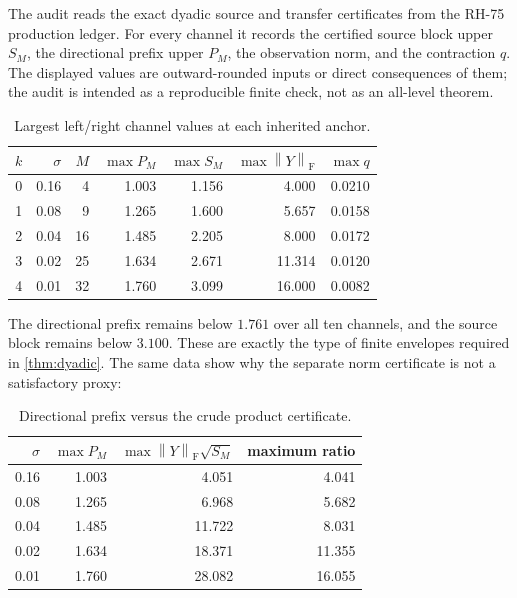 \documentclass[11pt]{article}
\theoremstyle{definition}
\theoremstyle{remark}
\newcommand{\norm}[1]{\left\lVert#1\right\rVert}
\newcommand{\F}{\mathrm F}
\begin{document}
The audit reads the exact dyadic source and transfer certificates from the
RH-75 production ledger.  For every channel it records the certified source
block upper $S_M$, the directional prefix upper $P_M$, the observation norm,
and the contraction $q$.  The displayed values are outward-rounded inputs or
direct consequences of them; the audit is intended as a reproducible finite
check, not as an all-level theorem.

\begin{table}[H]
\centering
\small
\caption{Largest left/right channel values at each inherited anchor.}
\label{tab:anchors}
\begin{tabular}{@{}rrrrrrr@{}}
\toprule
$k$ & $\sigma$ & $M$ & $\max P_M$ & $\max S_M$ & $\max\norm Y_{\F}$ & $\max q$\\
\midrule
0 & 0.16 & 4  & 1.003 & 1.156 & 4.000 & 0.0210\\
1 & 0.08 & 9  & 1.265 & 1.600 & 5.657 & 0.0158\\
2 & 0.04 & 16 & 1.485 & 2.205 & 8.000 & 0.0172\\
3 & 0.02 & 25 & 1.634 & 2.671 & 11.314 & 0.0120\\
4 & 0.01 & 32 & 1.760 & 3.099 & 16.000 & 0.0082\\
\bottomrule
\end{tabular}
\end{table}

The directional prefix remains below $1.761$ over all ten channels, and the
source block remains below $3.100$.  These are exactly the type of finite
envelopes required in \cref{thm:dyadic}.  The same data show why the separate
norm certificate is not a satisfactory proxy:

\begin{table}[H]
\centering
\small
\caption{Directional prefix versus the crude product certificate.}
\label{tab:loss}
\begin{tabular}{@{}rrrr@{}}
\toprule
$\sigma$ & $\max P_M$ & $\max\norm Y_{\F}\sqrt{S_M}$ &
 maximum ratio\\
\midrule
0.16 & 1.003 & 4.051 & 4.041\\
0.08 & 1.265 & 6.968 & 5.682\\
0.04 & 1.485 & 11.722 & 8.031\\
0.02 & 1.634 & 18.371 & 11.355\\
0.01 & 1.760 & 28.082 & 16.055\\
\bottomrule
\end{tabular}
\end{table}
\end{document}
